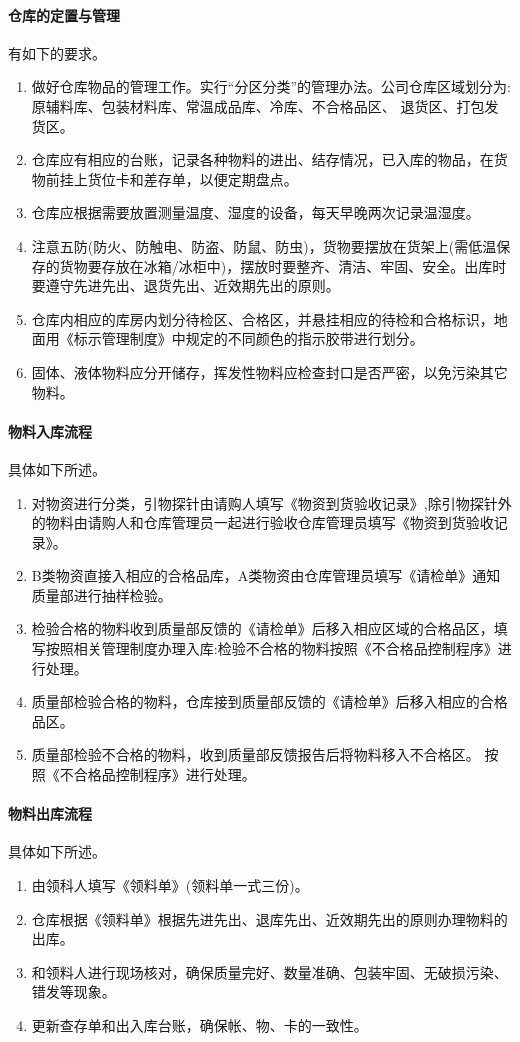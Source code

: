 \documentclass[cn,black,12pt,normal]{elegantnote}
\begin{document}
\paragraph{仓库的定置与管理} 有如下的要求。
\begin{enumerate}
    \item 做好仓库物品的管理工作。实行“分区分类”的管理办法。公司仓库区域划分为:原辅料库、包装材料库、常温成品库、冷库、不合格品区、 退货区、打包发货区。
    \item 仓库应有相应的台账，记录各种物料的进出、结存情况，已入库的物品，在货物前挂上货位卡和差存单，以便定期盘点。
    \item 仓库应根据需要放置测量温度、湿度的设备，每天早晚两次记录温湿度。
    \item 注意五防(防火、防触电、防盗、防鼠、防虫)，货物要摆放在货架上(需低温保存的货物要存放在冰箱/冰柜中)，摆放时要整齐、清洁、牢固、安全。出库时要遵守先进先出、退货先出、近效期先出的原则。
    \item 仓库内相应的库房内划分待检区、合格区，并悬挂相应的待检和合格标识，地面用《标示管理制度》中规定的不同颜色的指示胶带进行划分。
    \item 固体、液体物料应分开储存，挥发性物料应检查封口是否严密，以免污染其它物料。
\end{enumerate}

\paragraph{物料入库流程} 具体如下所述。
\begin{enumerate}
    \item 对物资进行分类，引物探针由请购人填写《物资到货验收记录》,除引物探针外的物料由请购人和仓库管理员一起进行验收仓库管理员填写《物资到货验收记录》。
    \item B类物资直接入相应的合格品库，A类物资由仓库管理员填写《请检单》通知质量部进行抽样检验。
    \item 检验合格的物料收到质量部反馈的《请检单》后移入相应区域的合格品区，填写按照相关管理制度办理入库:检验不合格的物料按照《不合格品控制程序》进行处理。
    \item 质量部检验合格的物料，仓库接到质量部反馈的《请检单》后移入相应的合格品区。
    \item 质量部检验不合格的物料，收到质量部反馈报告后将物料移入不合格区。 按照《不合格品控制程序》进行处理。
\end{enumerate}

\paragraph{物料出库流程} 具体如下所述。
\begin{enumerate}
    \item 由领科人填写《领料单》(领料单一式三份)。
    \item 仓库根据《领料单》根据先进先出、退库先出、近效期先出的原则办理物料的出库。
    \item 和领料人进行现场核对，确保质量完好、数量准确、包装牢固、无破损污染、错发等现象。
    \item 更新查存单和出入库台账，确保帐、物、卡的一致性。
\end{enumerate}
\end{document}
